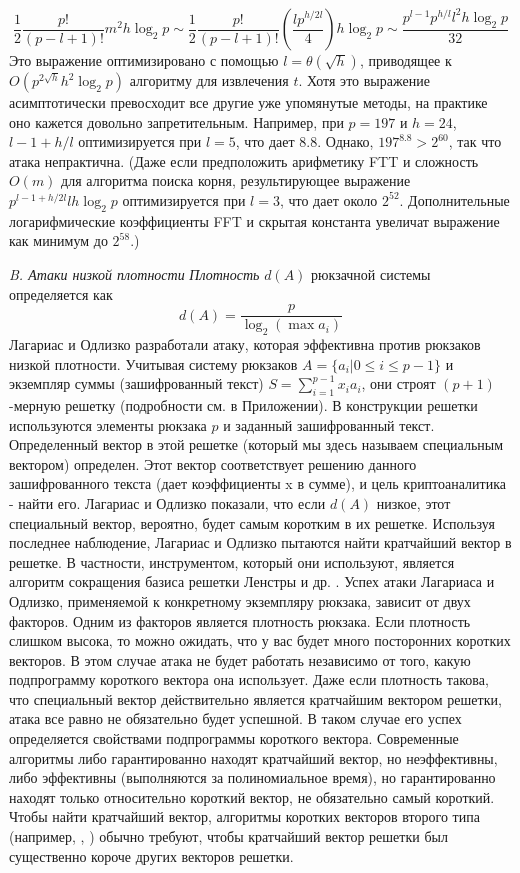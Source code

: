 \documentclass[a4paper,12pt]{article}
\newcommand{\DL}{\newline\newline}
\begin{document}
$$ \frac{1}{2} \frac{p!}{(p-l+1)!}m^2 h \log_2 p \sim \frac{1}{2} \frac{p!}{(p-l+1)!}(\frac{lp^{h/2l}}{4})h \log_2 p \sim \frac{p^{l-1}p^{h/l}l^{2}h \log_2 p}{32}$$
Это выражение оптимизировано с помощью $l = \theta(\sqrt{h})$, приводящее к $O(p^{2\sqrt{h}}h^2 \log_2 p)$ алгоритму для извлечения $t$. Хотя это выражение асимптотически превосходит все другие уже упомянутые методы, на практике оно кажется довольно запретительным. Например, при $p=197$ и $h=24$, $l -1 +h/l$ оптимизируется при $l = 5$, что дает 8.8. Однако, $197^{8.8} > 2^{60}$, так что атака непрактична. (Даже если предположить арифметику FTT и сложность $O(m)$ для алгоритма поиска корня, результирующее выражение $p^{l-1+h/2l} lh \log_2 p$ оптимизируется при $l = 3$, что дает около $2^52$. Дополнительные логарифмические коэффициенты FFT и скрытая константа увеличат выражение как минимум до $2^58$.) \DL

\textsl{B. Атаки низкой плотности} \newline
\indent \textsl{Плотность} $d(A)$ рюкзачной системы определяется как 
$$d(A) = \frac{p}{\log_2 (\max a_i)}$$
Лагариас и Одлизко \cite{17} разработали атаку, которая эффективна против рюкзаков низкой плотности. Учитывая систему рюкзаков $A = \{a_i | 0 \leq i \leq p - 1\}$ и экземпляр суммы (зашифрованный текст) $S = \sum_{i=1}^{p-1} x_i a_i $, они строят $(p +1)$-мерную решетку (подробности см. в Приложении). В конструкции решетки используются элементы рюкзака $p$ и заданный зашифрованный текст. Определенный вектор в этой решетке (который мы здесь называем специальным вектором) определен. Этот вектор соответствует решению данного зашифрованного текста (дает коэффициенты x в сумме), и цель криптоаналитика - найти его. Лагариас и Одлизко показали, что если $d(A)$ низкое, этот специальный вектор, вероятно, будет самым коротким в их решетке. Используя последнее наблюдение, Лагариас и Одлизко пытаются найти кратчайший вектор в решетке. В частности, инструментом, который они используют, является алгоритм сокращения базиса решетки Ленстры и др. \cite{18}. \newline
\indent Успех атаки Лагариаса и Одлизко, применяемой к конкретному экземпляру рюкзака, зависит от двух факторов. Одним из факторов является плотность рюкзака. Если плотность слишком высока, то можно ожидать, что у вас будет много посторонних коротких векторов. В этом случае атака не будет работать независимо от того, какую подпрограмму короткого вектора она использует. Даже если плотность такова, что специальный вектор действительно является кратчайшим вектором решетки, атака все равно не обязательно будет успешной. В таком случае его успех определяется свойствами подпрограммы короткого вектора. Современные алгоритмы либо гарантированно находят кратчайший вектор, но неэффективны, либо эффективны (выполняются за полиномиальное время), но гарантированно находят только относительно короткий вектор, не обязательно самый короткий. Чтобы найти кратчайший вектор, алгоритмы коротких векторов второго типа (например, \cite{18}, \cite{27}) обычно требуют, чтобы кратчайший вектор решетки был существенно короче других векторов решетки. \newline
\end{document}
